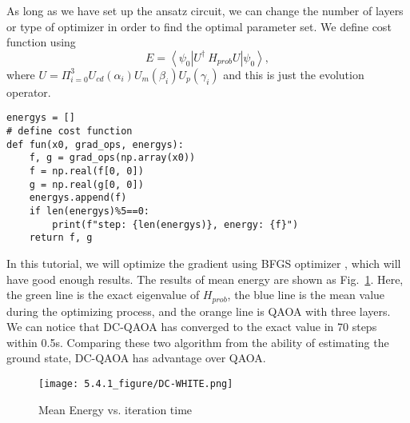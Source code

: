 As long as we have set up the ansatz circuit, we can change the number of layers or type of optimizer in order to find the optimal parameter set. We define cost function using
\begin{equation}
    E = \left<\psi_0\right|U^{\dagger}\ H_{prob} U\left|\psi_0\right>,
\end{equation}
where $U = \Pi_{i=0}^3 U_{cd}(\alpha_i)U_m(\beta_i)U_p(\gamma_i)$ and this is just the evolution operator.
\begin{lstlisting}
energys = []
# define cost function
def fun(x0, grad_ops, energys):
    f, g = grad_ops(np.array(x0))
    f = np.real(f[0, 0])
    g = np.real(g[0, 0])
    energys.append(f)
    if len(energys)%5==0:
        print(f"step: {len(energys)}, energy: {f}")
    return f, g
\end{lstlisting}

In this tutorial, we will optimize the gradient using BFGS optimizer \cite{chandarana2022meta}, which will have good enough results. The results of mean energy are shown as Fig.~\ref{fig:dc}. Here, the green line is the exact eigenvalue of $H_{prob}$, the blue line is the mean value during the optimizing process, and the orange line is QAOA with three layers. We can notice that DC-QAOA has converged to the exact value in 70 steps within 0.5s. Comparing these two algorithm from the ability of estimating the ground state, DC-QAOA has advantage over QAOA.
\begin{figure}
    \centering
    \texttt{[image: 5.4.1\_figure/DC-WHITE.png]}
    \caption{Mean Energy vs. iteration time}
    \label{fig:dc}
\end{figure}
